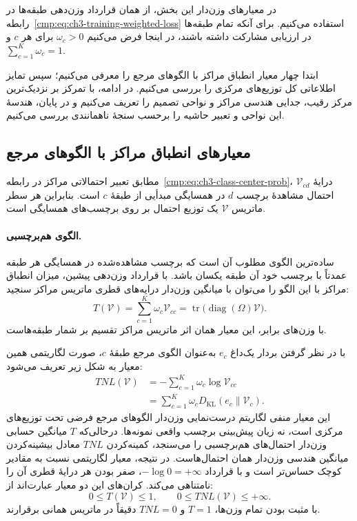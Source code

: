 در معیارهای وزن‌دار این بخش، از همان قرارداد وزن‌دهی
طبقه‌ها در رابطه~\eqref{cmp:eq:ch3-training-weighted-loss}
استفاده می‌کنیم. برای آنکه تمام طبقه‌ها در ارزیابی
مشارکت داشته باشند، در اینجا فرض می‌کنیم
$\omega_c>0$ برای هر $c$ و
$\sum_{c=1}^{K}\omega_c=1$.

ابتدا چهار معیار انطباق مراکز با الگوهای مرجع را
معرفی می‌کنیم؛ سپس تمایز اطلاعاتی کل توزیع‌های
مرکزی را بررسی می‌کنیم. در ادامه، با تمرکز بر
نزدیک‌ترین مرکز رقیب، جدایی هندسی مراکز و
نواحی تصمیم را تعریف می‌کنیم و در پایان،
هندسهٔ این نواحی و تعبیر حاشیه را برحسب
سنجهٔ ناهمانندی بررسی می‌کنیم.

\subsection{معیارهای انطباق مراکز با الگوهای مرجع}
\label{cmp:subsec:ch3-trace-criteria}

مطابق تعبیر احتمالاتی مراکز در
رابطه~\eqref{cmp:eq:ch3-class-center-prob}، درایهٔ
$\mathcal V_{cd}$ احتمال مشاهدهٔ برچسب $d$ در
همسایگی مبدأیی از طبقهٔ $c$ است. بنابراین هر سطر
ماتریس $\mathcal V$ یک توزیع احتمال بر روی
برچسب‌های همسایگی است.

\paragraph{الگوی هم‌برچسبی.}
ساده‌ترین الگوی مطلوب آن است که برچسب مشاهده‌شده
در همسایگی هر طبقه عمدتاً با برچسب خود آن طبقه
یکسان باشد. با قرارداد وزن‌دهی پیشین، میزان
انطباق مراکز با این الگو را می‌توان با
میانگین وزن‌دار درایه‌های قطری ماتریس مراکز سنجید:
\begin{equation}\label{cmp:eq:ch3-trace-score}
T(\mathcal V)=\sum_{c=1}^{K}\omega_c\mathcal V_{cc}
=\operatorname{tr}\bigl(\operatorname{diag}(\Omega)\mathcal V\bigr).
\end{equation}
با وزن‌های برابر، این معیار همان اثر ماتریس مراکز
تقسیم بر شمار طبقه‌هاست.

با در نظر گرفتن بردار یک‌داغ $e_c$ به‌عنوان
الگوی مرجع طبقهٔ $c$، صورت لگاریتمی همین معیار
به شکل زیر تعریف می‌شود:
\begin{equation}\label{cmp:eq:ch3-trace-log-cost}
\begin{aligned}
TNL(\mathcal V)&=-\sum_{c=1}^{K}\omega_c\log\mathcal V_{cc}\\
&=\sum_{c=1}^{K}\omega_c D_{\mathrm{KL}}(e_c\|\mathcal V_c).
\end{aligned}
\end{equation}
این معیار منفی لگاریتم درست‌نمایی وزن‌دار الگوهای
مرجع فرضی تحت توزیع‌های مرکزی است، نه زیان
پیش‌بینی برچسب واقعی نمونه‌ها. درحالی‌که $T$
میانگین حسابی وزن‌دار احتمال‌های هم‌برچسبی را
می‌سنجد، کمینه‌کردن $TNL$ معادل بیشینه‌کردن
میانگین هندسی وزن‌دار همان احتمال‌هاست. در نتیجه،
معیار لگاریتمی نسبت به مقادیر کوچک حساس‌تر است
و با قرارداد $-\log 0=+\infty$، صفر بودن هر
درایهٔ قطری آن را نامتناهی می‌کند. کران‌های این
دو معیار عبارت‌اند از:
\[
0\le T(\mathcal V)\le 1,\qquad
0\le TNL(\mathcal V)\le+\infty.
\]
با مثبت بودن تمام وزن‌ها، $T=1$ و $TNL=0$
دقیقاً در ماتریس همانی برقرارند.

